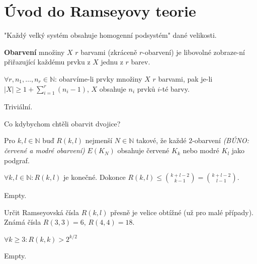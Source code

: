 \chapter{Úvod do Ramseyovy teorie}

"Každý velký systém obsahuje homogenní podsystém" dané velikosti.

\begin{definice}
	\textbf{Obarvení} množiny $X$ $r$ barvami (zkráceně $r$-obarvení) je libovolné zobraze-\newline ní přiřazující každému prvku z $X$ jednu z $r$ barev.
\end{definice}

\begin{veta}
	$\forall r, n_{1}, \dots , n_{r} \in \mathbb{N}$: obarvíme-li prvky množiny $X$ $r$ barvami, pak je-li $|X| \geq 1+ \sum_{i = 1}^{r}(n_{i} - 1)$, $X$ obsahuje $n_{i}$ prvků $i$-té barvy.
\end{veta}

\begin{dukaz}
	Triviální.
\end{dukaz}

Co kdybychom chtěli obarvit dvojice?

\begin{definice}
	Pro $k,l \in \mathbb{N}$ buď $R(k,l)$ nejmenší $N \in \mathbb{N}$ takové, že každé $2$-obarvení \textit{(BÚNO: červené a modré obarvení)} $E(K_{N})$ obsahuje červené $K_{k}$ nebo modré $K_{l}$ jako podgraf.
\end{definice}

\begin{veta}
	$\forall k,l \in \mathbb{N}: R(k,l)$ je konečné. Dokonce $R(k,l) \leq \binom{k+l-2}{k-1} = \binom{k+l-2}{l-1}$.
\end{veta}

\begin{dukaz}
	Empty.
\end{dukaz}

Určit Ramseyovská čísla $R(k,l)$ přesně je velice obtížné (už pro malé případy). Známá čísla $R(3,3) = 6$, $R(4,4) = 18$.

\begin{veta}
	$\forall k \geq 3: R(k,k) > 2^{k/2}$
\end{veta}

\begin{dukaz}
	Empty.
\end{dukaz}

